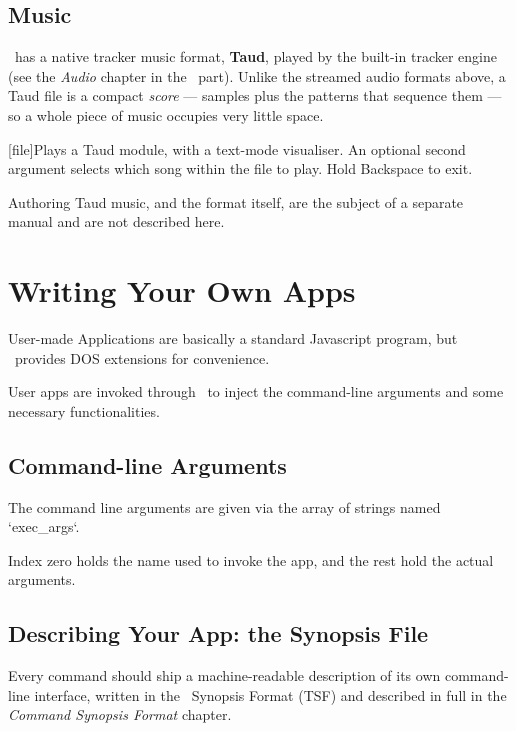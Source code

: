 \section{Music}

\thismachine\ has a native tracker music format, \textbf{Taud}, played by the built-in tracker engine (see the \emph{Audio} chapter in the \thismachine\ part). Unlike the streamed audio formats above, a Taud file is a compact \emph{score} --- samples plus the patterns that sequence them --- so a whole piece of music occupies very little space.

\begin{outline}
\1[file]{Plays a Taud module, with a text-mode visualiser. An optional second argument selects which song within the file to play. Hold Backspace to exit.}
\end{outline}

Authoring Taud music, and the format itself, are the subject of a separate manual and are not described here.


\chapter{Writing Your Own Apps}

User-made Applications are basically a standard Javascript program, but \thedos\ provides DOS extensions for convenience.

User apps are invoked through \thedos\ to inject the command-line arguments and some necessary functionalities.

\section{Command-line Arguments}

The command line arguments are given via the array of strings named `exec\_args`.

Index zero holds the name used to invoke the app, and the rest hold the actual arguments.


\section{Describing Your App: the Synopsis File}

Every command should ship a machine-readable description of its own command-line interface, written in the \thedos\ Synopsis Format (TSF) and described in full in the \emph{Command Synopsis Format} chapter.

